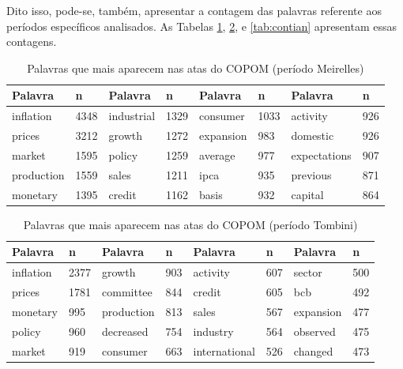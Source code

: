 Dito isso, pode-se, também, apresentar a contagem das palavras referente aos períodos específicos analisados. As Tabelas \ref{tab:contmeir}, \ref{tab:conttom}, e \ref{tab:contian} apresentam essas contagens.

\begin{table}[h]
\centering
\caption{Palavras que mais aparecem nas atas do COPOM (período Meirelles)}
\begin{tabular}{llllllll}
  \hline
Palavra & n & Palavra & n & Palavra & n & Palavra & n \\ 
  \hline
inflation & 4348 & industrial & 1329 & consumer & 1033 & activity & 926 \\ 
prices & 3212 & growth & 1272 & expansion & 983 & domestic & 926 \\ 
market & 1595 & policy & 1259 & average & 977 & expectations & 907 \\ 
production & 1559 & sales & 1211 & ipca & 935 & previous & 871 \\ 
monetary & 1395 & credit & 1162 & basis & 932 & capital & 864 \\ 
   \hline
\end{tabular}
\label{tab:contmeir}
\end{table}

\begin{table}[h]
\centering
\caption{Palavras que mais aparecem nas atas do COPOM (período Tombini)}
\begin{tabular}{llllllll}
  \hline
Palavra & n & Palavra & n & Palavra & n & Palavra & n \\ 
  \hline
inflation & 2377 & growth & 903 & activity & 607 & sector & 500 \\ 
  prices & 1781 & committee & 844 & credit & 605 & bcb & 492 \\ 
  monetary & 995 & production & 813 & sales & 567 & expansion & 477 \\ 
  policy & 960 & decreased & 754 & industry & 564 & observed & 475 \\ 
  market & 919 & consumer & 663 & international & 526 & changed & 473 \\ 
   \hline
\end{tabular}
\label{tab:conttom}
\end{table}

